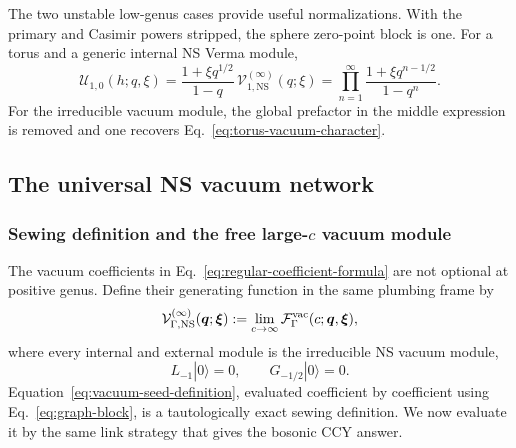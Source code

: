 \documentclass[11pt]{article}
\newcommand{\NS}{\mathrm{NS}}
\newcommand{\F}{\mathcal F}
\newcommand{\V}{\mathcal V}
\newcommand{\U}{\mathcal U}
\begin{document}
The two unstable low-genus cases provide useful normalizations.  With the
primary and Casimir powers stripped, the sphere zero-point block is one.
For a torus and a generic internal NS Verma module,
\begin{equation}
 \U_{1,0}(h;q,\xi)
 =\frac{1+\xi q^{1/2}}{1-q}\,
   \V_{1,\NS}^{(\infty)}(q;\xi)
 =\prod_{n=1}^{\infty}
   \frac{1+\xi q^{n-1/2}}{1-q^n}.
 \label{eq:torus-zero-point-generic}
\end{equation}
For the irreducible vacuum module, the global prefactor in the middle
expression is removed and one recovers
Eq.~\eqref{eq:torus-vacuum-character}.

\subsection{The universal NS vacuum network}
\label{sec:vacuum-seed}

\subsubsection{\texorpdfstring{Sewing definition and the free large-\(c\)
vacuum module}{Sewing definition and the free large-c vacuum module}}

The vacuum coefficients in Eq.~\eqref{eq:regular-coefficient-formula} are
not optional at positive genus.  Define their generating function in the
same plumbing frame by
\begin{equation}
 \V_{\Gamma,\NS}^{(\infty)}(\bm q;\bm\xi)
 :=\lim_{c\to\infty}
 \F_{\Gamma}^{\rm vac}(c;\bm q,\bm\xi),
 \label{eq:vacuum-seed-definition}
\end{equation}
where every internal and external module is the irreducible NS vacuum module,
\begin{equation}
 L_{-1}|0\rangle=0,
 \qquad
 G_{-1/2}|0\rangle=0.
 \label{eq:vacuum-quotient}
\end{equation}
Equation~\eqref{eq:vacuum-seed-definition}, evaluated coefficient by
coefficient using Eq.~\eqref{eq:graph-block}, is a tautologically exact
sewing definition.  We now evaluate it by the same link strategy that gives
the bosonic CCY answer.
\end{document}
